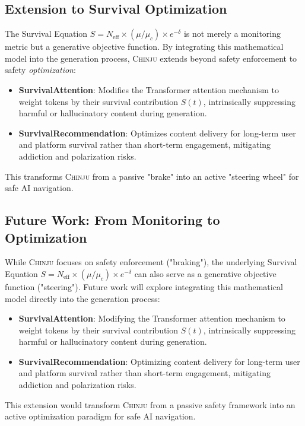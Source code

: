 \documentclass[11pt,a4paper]{article}
\newcommand{\chinju}{\textsc{Chinju}}
\newcommand{\Neff}{N_{\text{eff}}}
\newcommand{\muc}{\mu_c}
\begin{document}
\subsection{Extension to Survival Optimization}
The Survival Equation $S = \Neff \times (\mu/\muc) \times e^{-\delta}$ is not merely a monitoring metric but a generative objective function.
By integrating this mathematical model into the generation process, \chinju{} extends beyond safety enforcement to safety \emph{optimization}:
\begin{itemize}
    \item \textbf{SurvivalAttention}: Modifies the Transformer attention mechanism to weight tokens by their survival contribution $S(t)$, intrinsically suppressing harmful or hallucinatory content during generation.
    \item \textbf{SurvivalRecommendation}: Optimizes content delivery for long-term user and platform survival rather than short-term engagement, mitigating addiction and polarization risks.
\end{itemize}
This transforms \chinju{} from a passive "brake" into an active "steering wheel" for safe AI navigation.

\subsection{Future Work: From Monitoring to Optimization}
While \chinju{} focuses on safety enforcement ("braking"), the underlying Survival Equation $S = \Neff \times (\mu/\muc) \times e^{-\delta}$ can also serve as a generative objective function ("steering").
Future work will explore integrating this mathematical model directly into the generation process:
\begin{itemize}
    \item \textbf{SurvivalAttention}: Modifying the Transformer attention mechanism to weight tokens by their survival contribution $S(t)$, intrinsically suppressing harmful or hallucinatory content during generation.
    \item \textbf{SurvivalRecommendation}: Optimizing content delivery for long-term user and platform survival rather than short-term engagement, mitigating addiction and polarization risks.
\end{itemize}
This extension would transform \chinju{} from a passive safety framework into an active optimization paradigm for safe AI navigation.

\end{document}
